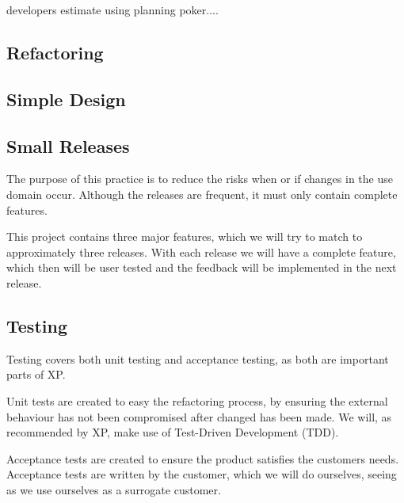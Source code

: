 developers estimate using planning poker....

\subsection{Refactoring}

\subsection{Simple Design}

\subsection{Small Releases}
The purpose of this practice is to reduce the risks when or if changes in the use domain occur.
Although the releases are frequent, it must only contain complete features.

This project contains three major features, which we will try to match to approximately three releases.
With each release we will have a complete feature, which then will be user tested and the feedback will be implemented in the next release.

\subsection{Testing}
Testing covers both unit testing and acceptance testing, as both are important parts of XP.

Unit tests are created to easy the refactoring process, by ensuring the external behaviour has not been compromised after changed has been made.
We will, as recommended by XP, make use of Test-Driven Development (TDD).

Acceptance tests are created to ensure the product satisfies the customers needs.
Acceptance tests are written by the customer, which we will do ourselves, seeing as we use ourselves as a surrogate customer.

